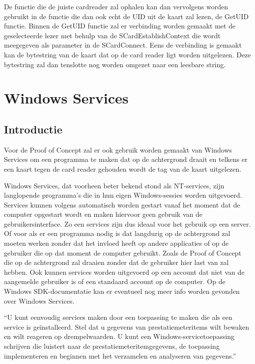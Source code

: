 De functie die de juiste cardreader zal ophalen kan dan vervolgens worden gebruikt in de functie die dan ook echt de UID uit de kaart zal lezen, de GetUID functie. Binnen de GetUID functie zal er verbinding worden gemaakt met de geselecteerde lezer met behulp van de SCardEstablishContext die wordt meegegeven als parameter in de SCardConnect. Eens de verbinding is gemaakt kan de bytestring van de kaart dat op de card reader ligt worden uitgelezen. Deze bytestring zal dan tenslotte nog worden omgezet naar een leesbare string. 




\section{Windows Services}
\subsection{Introductie}
Voor de Proof of Concept zal er ook gebruik worden gemaakt van Windows Services om een programma te maken dat op de achtergrond draait en telkens er een kaart tegen de card reader gehouden wordt de tag van de kaart uitgelezen. 

Windows Services, dat voorheen beter bekend stond als NT-services, zijn langlopende programma's die in hun eigen Windows-sessies worden uitgevoerd. Services kunnen volgens \textcite{DevMozService} automatisch worden gestart vanaf het moment dat de computer opgestart wordt en maken hiervoor geen gebruik van de gebruikersinterface. Zo een services zijn dus ideaal voor het gebruik op een server. Of voor als er een programma nodig is dat langdurig op de achtergrond zal moeten werken zonder dat het invloed heeft op andere applicaties of op de gebruiker die op dat moment de computer gebruikt. Zoals de Proof of Concept die op de achtergrond zal draaien zonder dat de gebruiker hier last van zal hebben. Ook kunnen services worden uitgevoerd op een account dat niet van de aangemelde gebruiker is of een standaard account op de computer. Op de Windows SDK-documentatie kan er eventueel nog meer info worden gevonden over Windows Services. 

``U kunt eenvoudig services maken door een toepassing te maken die als een service is geïnstalleerd. Stel dat u gegevens van prestatiemeteritems wilt bewaken en wilt reageren op drempelwaarden. U kunt een Windows-servicetoepassing schrijven die luistert naar de prestatiemeteritemgegevens, de toepassing implementeren en beginnen met het verzamelen en analyseren van gegevens.''\autocite{DevMozService}

